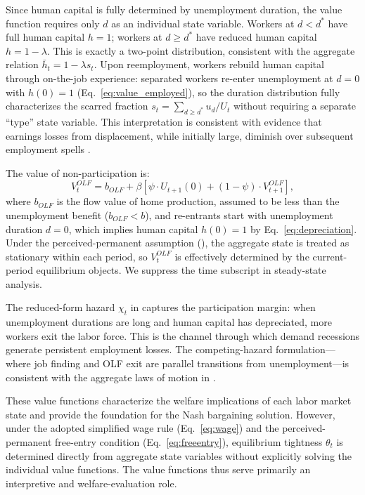 \documentclass[12pt]{article}
\begin{document}
Since human capital is fully determined by unemployment duration, the value function requires only $d$ as an individual state variable. Workers at $d < d^*$ have full human capital $h = 1$; workers at $d \geq d^*$ have reduced human capital $h = 1 - \lambda$. This is exactly a two-point distribution, consistent with the aggregate relation $\bar{h}_t = 1 - \lambda s_t$. Upon reemployment, workers rebuild human capital through on-the-job experience: separated workers re-enter unemployment at $d = 0$ with $h(0) = 1$ (Eq.~\ref{eq:value_employed}), so the duration distribution fully characterizes the scarred fraction $s_t = \sum_{d \geq d^*} u_d / U_t$ without requiring a separate ``type'' state variable. This interpretation is consistent with evidence that earnings losses from displacement, while initially large, diminish over subsequent employment spells \citep{jacobson1993earnings, jarosch2023searching}.

The value of non-participation is:
\begin{equation}
V^{OLF}_t = b_{OLF} + \beta \left[ \psi \cdot U_{t+1}(0) + (1 - \psi) \cdot V^{OLF}_{t+1} \right],
\label{eq:value_olf}
\end{equation}
where $b_{OLF}$ is the flow value of home production, assumed to be less than the unemployment benefit ($b_{OLF} < b$), and re-entrants start with unemployment duration $d = 0$, which implies human capital $h(0) = 1$ by Eq.~\ref{eq:depreciation}. Under the perceived-permanent assumption (), the aggregate state is treated as stationary within each period, so $V^{OLF}_t$ is effectively determined by the current-period equilibrium objects. We suppress the time subscript in steady-state analysis.

The reduced-form hazard $\chi_t$ in  captures the participation margin: when unemployment durations are long and human capital has depreciated, more workers exit the labor force. This is the channel through which demand recessions generate persistent employment losses. The competing-hazard formulation---where job finding and OLF exit are parallel transitions from unemployment---is consistent with the aggregate laws of motion in .

These value functions characterize the welfare implications of each labor market state and provide the foundation for the Nash bargaining solution. However, under the adopted simplified wage rule (Eq.~\ref{eq:wage}) and the perceived-permanent free-entry condition (Eq.~\ref{eq:freeentry}), equilibrium tightness $\theta_t$ is determined directly from aggregate state variables without explicitly solving the individual value functions. The value functions thus serve primarily an interpretive and welfare-evaluation role.
\end{document}
